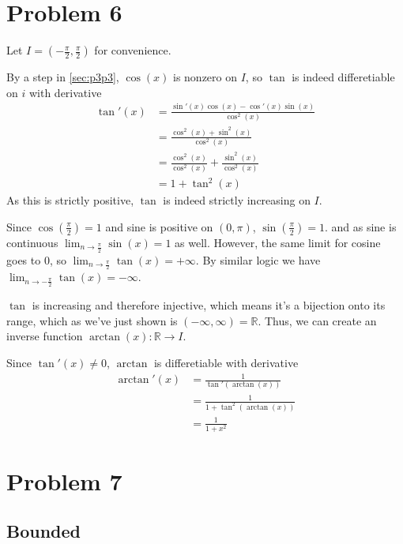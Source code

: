 \documentclass[12pt]{article}
\newcommand{\R}{\mathbb{R}}
\begin{document}
\pagebreak

\section{Problem 6}

Let $I=\left(-\frac{\pi}{2}, \frac{\pi}{2}\right)$ for convenience.

By a step in \ref{sec:p3p3}, $\cos(x)$ is nonzero on $I$, so
$\tan$ is indeed differetiable on $i$ with derivative
\begin{align*}
  \tan'(x)
   & = \frac{\sin'(x)\cos(x)-\cos'(x)\sin(x)}{\cos^2(x)}       \\
   & = \frac{\cos^2(x)+\sin^2(x)}{\cos^2(x)}                   \\
   & = \frac{\cos^2(x)}{\cos^2(x)}+\frac{\sin^2(x)}{\cos^2(x)} \\
   & = 1+\tan^2(x)
\end{align*}
As this is strictly positive, $\tan$ is indeed strictly increasing on $I$.

Since $\cos\left(\frac{\pi}{2}\right)=1$
and sine is positive on $(0, \pi)$, $\sin\left(\frac{\pi}{2}\right)=1$.
and as sine is continuous $\lim_{n \to \frac{\pi}{2}} \sin(x) = 1$ as well.
However, the same limit for cosine goes to $0$, so $\lim_{n \to \frac{\pi}{2}} \tan(x)=+\infty$.
By similar logic we have $\lim_{n \to -\frac{\pi}{2}} \tan(x)=-\infty$.

$\tan$ is increasing and therefore injective, which means it's a bijection onto its range,
which as we've just shown is $(-\infty, \infty)=\R$.
Thus, we can create an inverse function $\arctan(x): \R \to I$.

Since $\tan'(x) \ne 0$, $\arctan$ is differetiable with derivative
\begin{align*}
  \arctan'(x)
   & =\frac{1}{\tan'(\arctan(x))}    \\
   & =\frac{1}{1+\tan^2(\arctan(x))} \\
   & =\frac{1}{1+x^2}
\end{align*}

\pagebreak

\section{Problem 7}

\subsection{Bounded}
\end{document}
